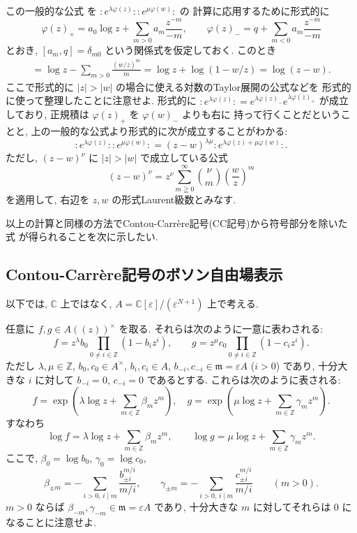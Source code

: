\documentclass[12pt,twoside]{jarticle}
\newcommand\Z{{\mathbb Z}} %
\newcommand\C{{\mathbb C}} %
\theoremstyle{definition} %
\theoremstyle{definition} %
\theoremstyle{definition} %
\numberwithin{theorem}{section}
\numberwithin{equation}{section}
\numberwithin{figure}{section}
\numberwithin{table}{section}
\newcommand\eps{\varepsilon}
\newcommand\m{{\mathfrak m}}
\newcommand\np[1]{{:}{#1}{:}}
\begin{document}
この一般的な公式
を $\np{e^{\lambda\varphi(z)}}\np{e^{\mu\varphi(w)}}$ の
計算に応用するために形式的に
\[
\varphi(z)_+ = a_0\log z + \sum_{m>0} a_m \frac{z^{-m}}{-m}, \qquad
\varphi(z)_- = q         + \sum_{m<0} a_m \frac{z^{-m}}{-m}
\]
とおき, $[a_m,q]=\delta_{m0}$ という関係式を仮定しておく. このとき
\begin{align*}
[\varphi_+(z), \varphi_-(w)]
= \log z - \sum_{m>0}\frac{(w/z)^m}{m}
= \log z + \log(1-w/z)
= \log(z-w). 
\end{align*}
ここで形式的に $|z|>|w|$ の場合に使える対数のTaylor展開の公式などを
形式的に使って整理したことに注意せよ. 
形式的に $\np{e^{\lambda\varphi(z)}}=e^{\lambda\varphi(z)_-}e^{\lambda\varphi(z)_+}$
が成立しており, 正規積は $\varphi(z)_+$ を $\varphi(w)_-$ よりも右に
持って行くことだということと, 上の一般的な公式より形式的に次が成立することがわかる:
\[
\np{e^{\lambda\varphi(z)}}\np{e^{\mu\varphi(w)}}
=(z-w)^{\lambda\mu}\np{e^{\lambda\varphi(z)+\mu\varphi(w)}}.
\]
ただし, $(z-w)^\nu$ に $|z|>|w|$ で成立している公式
\[
(z-w)^\nu
= z^\nu\sum_{m\geqq 0}^\infty \binom{\nu}{m} \left(\frac{w}{z}\right)^m
\]
を適用して, 右辺を $z,w$ の形式Laurent級数とみなす.

以上の計算と同様の方法でContou-Carr\`ere記号(CC記号)から符号部分を除いた式
が得られることを次に示したい.


\subsection{Contou-Carr\`ere記号のボソン自由場表示}

以下では, $\C$ 上ではなく, $A=\C[\eps]/(\eps^{N+1})$ 上で考える.

任意に $f,g\in A((z))^\times$ を取る.
それらは次のように一意に表わされる:
\[
f = z^\lambda b_0\prod_{0\ne i\in\Z}(1-b_i z^i), \qquad
g = z^\mu     c_0\prod_{0\ne i\in\Z}(1-c_i z^i).
\]
ただし $\lambda,\mu\in\Z$, $b_0,c_0\in A^\times$,
$b_i,c_i\in A$, $b_{-i},c_{-i}\in\m=\eps A$ ($i>0$) であり,
十分大きな $i$ に対して $b_{-i}=0$, $c_{-i}=0$ であるとする.
これらは次のように表される:
\[
f = \exp\left(\lambda\log z+\sum_{m\in\Z} \beta_m  z^m \right), \quad
g = \exp\left(\mu\log z    +\sum_{m\in\Z} \gamma_m z^m \right).
\]
すなわち
\[
\log f = \lambda\log z+\sum_{m\in\Z} \beta_m  z^m, \qquad
\log g = \mu\log z    +\sum_{m\in\Z} \gamma_m z^m.
\]
ここで, $\beta_0=\log b_0$, $\gamma_0=\log c_0$, 
\[
\beta_{\pm m}  = - \sum_{i>0,\, i\mid m}\frac{b_{\pm i}^{m/i}}{m/i}, \qquad
\gamma_{\pm m} = - \sum_{i>0,\, i\mid m}\frac{c_{\pm i}^{m/i}}{m/i}
\qquad (m>0).
\]
$m>0$ ならば $\beta_{-m},\gamma_{-m}\in\m=\eps A$ であり, 
十分大きな $m$ に対してそれらは $0$ になることに注意せよ. 
\end{document}
